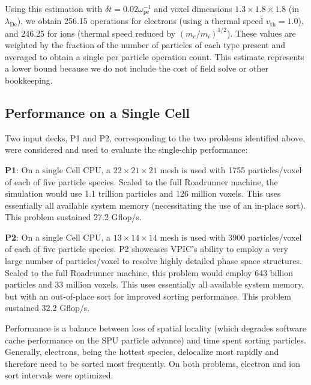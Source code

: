 \documentclass[10pt]{article}
\newcommand{\lde}      {\lambda_{\mathrm{De}}}
\newcommand{\wpe}      {\omega_{\mathrm{pe}}}
\begin{document}
Using this estimation with $\delta t = 0.02 \wpe^{-1}$ and voxel 
dimensions $1.3 \times 1.8 \times 1.8$ (in $\lde$), we obtain 
256.15 operations for electrons (using a thermal speed $v_{\mathrm{th}} =
1.0$), and 246.25 for ions (thermal speed reduced by
$(m_e/m_i)^{1/2}$).  These values are weighted by the fraction of 
the number of particles of each type present and averaged to obtain 
a single per particle operation count.  This estimate represents a 
lower bound because we do not include the cost of field solve or 
other bookkeeping.

\subsection{Performance on a Single Cell}

Two input decks, P1 and P2, corresponding to the two problems
identified above, were considered and used to evaluate the
single-chip performance:

\textbf{P1}:  On a single Cell CPU, a $22 \times 21 \times 21$ mesh 
is used with 1755 particles/voxel of each of five particle species.
Scaled to the full Roadrunner machine, the simulation would
use 1.1 trillion particles and 126 million voxels.  This uses
essentially all available system memory (necessitating the use of an
in-place sort).  This problem sustained 27.2 Gflop/s.

\textbf{P2}:  On a single Cell CPU, a $13 \times 14 \times 14$ mesh 
is used with 3900 particles/voxel of each of five particle species.
P2 showcases VPIC's ability to employ a very large number of
particles/voxel to resolve highly detailed phase space structures.
Scaled to the full Roadrunner machine, this problem would employ 643
billion particles and 33 million voxels. This uses essentially all
available system memory, but with an out-of-place sort for improved
sorting performance.  This problem sustained 32.2 Gflop/s.

Performance is a balance between loss of spatial locality (which
degrades software cache performance on the SPU particle advance) and
time spent sorting particles.  Generally, electrons, being the hottest
species, delocalize most rapidly and therefore need to be sorted most 
frequently.  On both problems, electron and ion sort intervals were 
optimized.  
\end{document}
